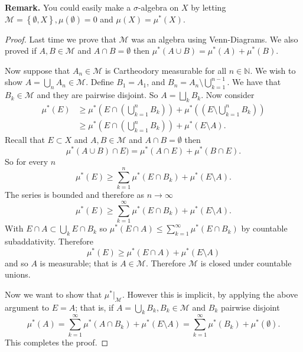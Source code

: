 \documentclass[letter]{article}
\newcommand{\set}[1]{ \left\{ #1 \right\} }
\def\scriptm{{\mathcal M}}
\begin{document}
\noindent \textbf{Remark.} You could easily make a $\sigma$-algebra on $X$ by letting $\scriptm = \set{\emptyset, X}, \mu(\emptyset) = 0$ and $\mu(X) = \mu^*(X)$.
\begin{proof}
	Last time we prove that $\scriptm$ was an algebra using Venn-Diagrams. We also proved if $A, B \in \scriptm$ and $A \cap B = \emptyset$ then $\mu^*(A \cup B) = \mu^*(A) + \mu^*(B).$

	Now suppose that $A_n \in \scriptm$ is Cartheodory measurable for all $n \in \mathbb{N}$. We wish to show $A = \bigcup_n A_n \in \scriptm$. Define $B_1 = A_1$, and $B_n = A_n \setminus \bigcup_{k=1}^{n-1}.$ We have that $B_k \in \scriptm$ and they are pairwise disjoint. So
	$A = \bigsqcup_k B_k$. Now consider
	\begin{equation*}
		\begin{aligned}
			\mu^*(E) &\geq \mu^*\left(E \cap \left(\bigcup_{k=1}^n B_k\right)\right) + \mu^*\left((E \setminus \bigcup_{k=1}^n B_k)\right) \\
			&\geq 	\mu^*\left(E \cap \left(\bigcup_{k=1}^n B_k\right)\right) + \mu^*(E \setminus A).
		\end{aligned}
	\end{equation*}
	Recall that  $E \subset X$ and $A,B \in \scriptm$ and $A \cap B = \emptyset$ then $$\mu^*(A \cup B) \cap E) = \mu^*(A \cap E) + \mu^*(B \cap E).$$
	So for every $n$
	\begin{equation*}
		\mu^*(E) \geq 
		\sum_{k=1}^n \mu^*(E \cap B_k) + \mu^*(E \setminus A).
	\end{equation*} 
	The series is bounded and therefore as $n \to \infty$
	\begin{equation*}
		\mu^*(E) \geq 
		\sum_{k=1}^\infty \mu^*(E \cap B_k) + \mu^*(E \setminus A).
	\end{equation*}
	With $E \cap A \subset \bigcup_{k} E \cap B_k$ so $\mu^*(E \cap A) \leq \sum_{k=1}^\infty \mu^*(E \cap B_k)$ by countable subaddativity. Therefore 
	\begin{equation*}
		\mu^*(E) \geq \mu^*(E \cap A) + \mu^*(E \setminus A)
	\end{equation*}
	and so $A$ is measurable; that is $A \in \scriptm$. Therefore $\scriptm$ is closed under countable unions.

	Now we want to show that $\mu^*|_\scriptm$. However this is implicit, by applying the above argument to $E = A$; that is, if $A = \bigcup_k B_k, B_k \in \scriptm$ and $B_k$ pairwise disjoint
	\begin{equation*}
		\mu^*(A) = \sum_{k=1}^\infty \mu^*(A \cap B_k) + \mu^*(E \setminus A) = \sum_{k=1}^\infty \mu^*( B_k) + \mu^*(\emptyset).
	\end{equation*}
	This completes the proof.
\end{proof}
\end{document}
